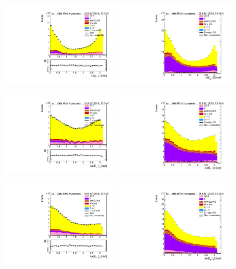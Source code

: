 \begin{figure}[htp]
	\includegraphics[width=0.45\textwidth]{plots/em/DeltaPhiL2Z_CR.pdf}
	\includegraphics[width=0.45\textwidth]{plots/em/DeltaPhiL2Z_withsignal.pdf}

	\includegraphics[width=0.45\textwidth]{plots/em/DeltaPhiMetL1_CR.pdf}
	\includegraphics[width=0.45\textwidth]{plots/em/DeltaPhiMetL1_withsignal.pdf}

	\includegraphics[width=0.45\textwidth]{plots/em/DeltaPhiMetL2_CR.pdf}
	\includegraphics[width=0.45\textwidth]{plots/em/DeltaPhiMetL2_withsignal.pdf}
\end{figure}


